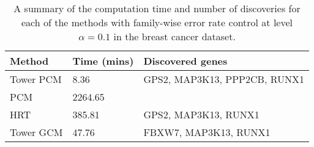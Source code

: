 \begin{table}[H]

\centering
\begin{tabular}[t]{l|l|l}
\hline
Method & Time (mins) & Discovered genes\\
\hline
Tower PCM & 8.36 & GPS2, MAP3K13, PPP2CB, RUNX1\\
\hline
PCM & 2264.65 & \\
\hline
HRT & 385.81 & GPS2, MAP3K13, RUNX1\\
\hline
Tower GCM & 47.76 & FBXW7, MAP3K13, RUNX1\\
\hline
\end{tabular}

\caption{\label{tab:real_da_results}A summary of the computation time and number of discoveries for each of the methods with family-wise error rate control at level \(\alpha = 0.1\) in the breast cancer dataset.}
\end{table}
